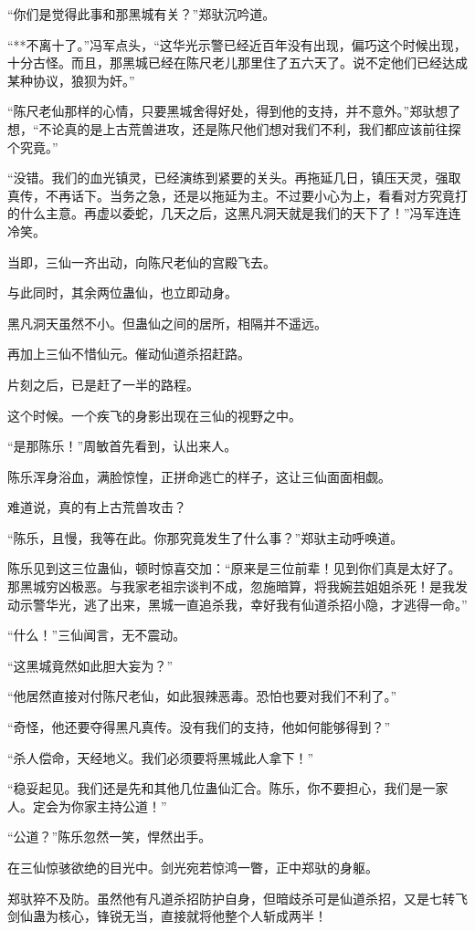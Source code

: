 \begin{this_body}
“你们是觉得此事和那黑城有关？”郑驮沉吟道。

“**不离十了。”冯军点头，“这华光示警已经近百年没有出现，偏巧这个时候出现，十分古怪。而且，那黑城已经在陈尺老儿那里住了五六天了。说不定他们已经达成某种协议，狼狈为奸。”

“陈尺老仙那样的心情，只要黑城舍得好处，得到他的支持，并不意外。”郑驮想了想，“不论真的是上古荒兽进攻，还是陈尺他们想对我们不利，我们都应该前往探个究竟。”

“没错。我们的血光镇灵，已经演练到紧要的关头。再拖延几日，镇压天灵，强取真传，不再话下。当务之急，还是以拖延为主。不过要小心为上，看看对方究竟打的什么主意。再虚以委蛇，几天之后，这黑凡洞天就是我们的天下了！”冯军连连冷笑。

当即，三仙一齐出动，向陈尺老仙的宫殿飞去。

与此同时，其余两位蛊仙，也立即动身。

黑凡洞天虽然不小。但蛊仙之间的居所，相隔并不遥远。

再加上三仙不惜仙元。催动仙道杀招赶路。

片刻之后，已是赶了一半的路程。

这个时候。一个疾飞的身影出现在三仙的视野之中。

“是那陈乐！”周敏首先看到，认出来人。

陈乐浑身浴血，满脸惊惶，正拼命逃亡的样子，这让三仙面面相觑。

难道说，真的有上古荒兽攻击？

“陈乐，且慢，我等在此。你那究竟发生了什么事？”郑驮主动呼唤道。

陈乐见到这三位蛊仙，顿时惊喜交加：“原来是三位前辈！见到你们真是太好了。那黑城穷凶极恶。与我家老祖宗谈判不成，忽施暗算，将我婉芸姐姐杀死！是我发动示警华光，逃了出来，黑城一直追杀我，幸好我有仙道杀招小隐，才逃得一命。”

“什么！”三仙闻言，无不震动。

“这黑城竟然如此胆大妄为？”

“他居然直接对付陈尺老仙，如此狠辣恶毒。恐怕也要对我们不利了。”

“奇怪，他还要夺得黑凡真传。没有我们的支持，他如何能够得到？”

“杀人偿命，天经地义。我们必须要将黑城此人拿下！”

“稳妥起见。我们还是先和其他几位蛊仙汇合。陈乐，你不要担心，我们是一家人。定会为你家主持公道！”

“公道？”陈乐忽然一笑，悍然出手。

在三仙惊骇欲绝的目光中。剑光宛若惊鸿一瞥，正中郑驮的身躯。

郑驮猝不及防。虽然他有凡道杀招防护自身，但暗歧杀可是仙道杀招，又是七转飞剑仙蛊为核心，锋锐无当，直接就将他整个人斩成两半！


\end{this_body}
